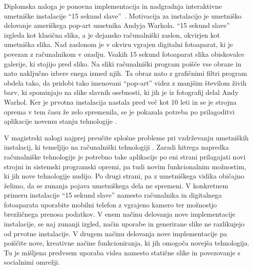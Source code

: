 Diplomska naloga je ponovna implementacija in nadgradnja interaktivne umetniške instalacije ``15 sekund slave''~\cite{15secLeonardo}. Motivacija za instalacijo je umetniško delovanje ameriškega pop-art umetnika Andyja Warhola. ``15 sekund slave'' izgleda kot klasična slika, a je dejansko računalniški zaslon, okvirjen kot umetniška slika. Nad zaslonom je v okviru vgrajen digitalni fotoaparat, ki je povezan z računalnikom v ozadju. Vsakih 15 sekund fotoaparat slika obiskovalce galerije, ki stojijo pred sliko. Na sliki računalniški program poišče vse obraze in nato naključno izbere enega izmed njih. Ta obraz nato z grafičnimi filtri program obdela tako, da pridobi tako imenovani ``pop-art'' videz z manjšim številom živih barv, ki spominjajo na slike slavnih osebnosti, ki jih je iz fotografij delal Andy Warhol. Ker je prvotna instalacija nastala pred več kot 10 leti in se je strojna oprema v tem času že zelo spremenila, se je pokazala potreba po prilagoditvi aplikacije novemu stanju tehnologije \cite{trifonova}.

V magistrski nalogi najprej preučite splošne probleme pri vzdrževanju umetniških instalacij, ki temeljijo na računalniški tehnologiji \cite{miller1,miller2,digitalartconservation}. Zaradi hitrega napredka računalniške tehnologije je potrebno take aplikacije po eni strani prilagajati novi strojni in sistemski programski opremi, pa tudi novim funkcionalnim možnostim, ki jih nove tehnologije nudijo. Po drugi strani, pa z umetniškega vidika običajno želimo, da se zunanja pojava umetniškega dela ne spremeni. V konkretnem primeru instalacije ``15 sekund slave'' namesto računalnika in digitalnega fotoaparata uporabite mobilni telefon z vgrajeno kamero ter možnostjo brezžičnega prenosa podatkov. V enem načinu delovanja nove implementacije instalacije, se naj zunanji izgled, način uporabe in generirane slike ne razlikujejo od prvotne instalacije. V drugem načinu delovanja nove implementacije pa poiščite nove, kreativne načine funkcioniranja, ki jih omogoča novejša tehnologija. Tu je mišljena predvsem uporaba videa namesto statične slike in povezovanje s socialnimi omrežji.